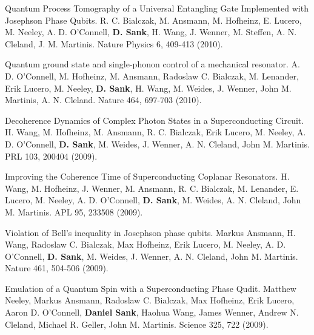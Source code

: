 \documentclass[margin=2cm,line]{res}
\newenvironment{list3}{
  \begin{list}{}{%
      \setlength{\itemsep}{0in}
      \setlength{\parsep}{0in} \setlength{\parskip}{0in}
      \setlength{\topsep}{0in} \setlength{\partopsep}{0in}
      \setlength{\leftmargin}{0.2in}}}{\end{list}}
\begin{document}
\begin{resume}
\begin{list3}
\item Quantum Process Tomography of a Universal Entangling Gate Implemented with Josephson Phase Qubits. R. C. Bialczak, M. Ansmann, M. Hofheinz, E. Lucero, M. Neeley, A. D. O'Connell, \textbf{D. Sank}, H. Wang, J. Wenner, M. Steffen, A. N. Cleland, J. M. Martinis. Nature Physics 6, 409-413 (2010). \\

\end{list3}

\pagebreak

\begin{list3}

\item Quantum ground state and single-phonon control of a mechanical resonator. A. D. O'Connell, M. Hofheinz, M. Ansmann, Radoslaw C. Bialczak, M. Lenander, Erik Lucero, M. Neeley, \textbf{D. Sank}, H. Wang, M. Weides, J. Wenner, John M. Martinis, A. N. Cleland. Nature 464, 697-703 (2010). \\

\item Decoherence Dynamics of Complex Photon States in a Superconducting Circuit. H. Wang, M. Hofheinz, M. Ansmann, R. C. Bialczak, Erik Lucero, M. Neeley, A. D. O'Connell, \textbf{D. Sank}, M. Weides, J. Wenner, A. N. Cleland, John M. Martinis. PRL 103, 200404 (2009). \\

\item Improving the Coherence Time of Superconducting Coplanar Resonators. H. Wang, M. Hofheinz, J. Wenner, M. Ansmann, R. C. Bialczak, M. Lenander, E. Lucero, M. Neeley, A. D. O'Connell, \textbf{D. Sank}, M. Weides, A. N. Cleland, John M. Martinis. APL 95, 233508 (2009). \\

\item Violation of Bell's inequality in Josephson phase qubits. Markus Ansmann, H. Wang, Radoslaw C. Bialczak, Max Hofheinz, Erik Lucero, M. Neeley, A. D. O'Connell, \textbf{D. Sank}, M. Weides, J. Wenner, A. N. Cleland, John M. Martinis. Nature 461, 504-506 (2009).

\item Emulation of a Quantum Spin with a Superconducting Phase Qudit. Matthew Neeley, Markus Ansmann, Radoslaw C. Bialczak, Max Hofheinz, Erik Lucero, Aaron D. O'Connell, \textbf{Daniel Sank}, Haohua Wang, James Wenner, Andrew N. Cleland, Michael R. Geller, John M. Martinis. Science 325, 722 (2009). \\


\end{list3}
\end{resume}
\end{document}
